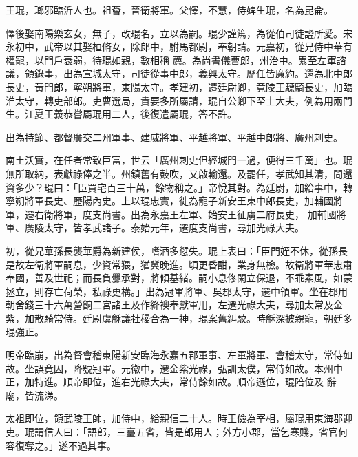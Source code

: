 
\begin{pinyinscope}

 王琨，瑯邪臨沂人也。祖薈，晉衛將軍。父懌，不慧，侍婢生琨，名為昆侖。



 懌後娶南陽樂玄女，無子，改琨名，立以為嗣。琨少謹篤，為從伯司徒謐所愛。宋永初中，武帝以其娶桓脩女，除郎中，駙馬都尉，奉朝請。元嘉初，從兄侍中華有權寵，以門戶衰弱，待琨如親，數相稱
 薦。為尚書儀曹郎，州治中。累至左軍諮議，領錄事，出為宣城太守，司徒從事中郎，義興太守。歷任皆廉約。還為北中郎長史，黃門郎，寧朔將軍，東陽太守。孝建初，遷廷尉卿，竟陵王驃騎長史，加臨淮太守，轉吏部郎。吏曹選局，貴要多所屬請，琨自公卿下至士大夫，例為用兩門生。江夏王義恭嘗屬琨用二人，後復遣屬琨，答不許。



 出為持節、都督廣交二州軍事、建威將軍、平越將軍、平越中郎將、廣州刺史。



 南土沃實，在任者常致巨富，世云「廣州刺史但經城門一過，便得三千萬」也。琨無所取納，表獻祿俸之半。州鎮舊有鼓吹，又啟輸還。及罷任，孝武知其清，問還資多少？琨曰：「臣買宅百三十萬，餘物稱之。」帝悅其對。為廷尉，加給事中，轉寧朔將軍長史、歷陽內史。上以琨忠實，徙為寵子新安王東中郎長史，加輔國將軍，遷右衛將軍，度支尚書。出為永嘉王左軍、始安王征虜二府長史，
 加輔國將軍、廣陵太守，皆孝武諸子。泰始元年，遷度支尚書，尋加光祿大夫。



 初，從兄華孫長襲華爵為新建侯，嗜酒多愆失。琨上表曰：「臣門姪不休，從孫長是故左衛將軍嗣息，少資常猥，猶冀晚進。頃更昏酣，業身無檢。故衛將軍華忠肅奉國，善及世祀；而長負釁承對，將傾基緒。嗣小息佟閑立保退，不乖素風，如蒙拯立，則存亡荷榮，私祿更構。」出為冠軍將軍、吳郡太守，遷中領軍。坐在郡用朝舍錢三十六萬營餉二宮諸王及作絳襖奉獻軍用，左遷光祿大夫，尋加太常及金紫，加散騎常侍。廷尉虞龢議社稷合為一神，琨案舊糾駮。時龢深被親寵，朝廷多琨強正。



 明帝臨崩，出為督會稽東陽新安臨海永嘉五郡軍事、左軍將軍、會稽太守，常侍如故。坐誤竟囚，降號冠軍。元徽中，遷金紫光祿，弘訓太僕，常侍如故。本州中正，加特進。順帝即位，進右光祿大夫，常侍餘如故。順帝遜位，琨陪位及
 辭廟，皆流涕。



 太祖即位，領武陵王師，加侍中，給親信二十人。時王儉為宰相，屬琨用東海郡迎吏。琨謂信人曰：「語郎，三臺五省，皆是郎用人；外方小郡，當乞寒賤，省官何容復奪之。」遂不過其事。




\end{pinyinscope}
